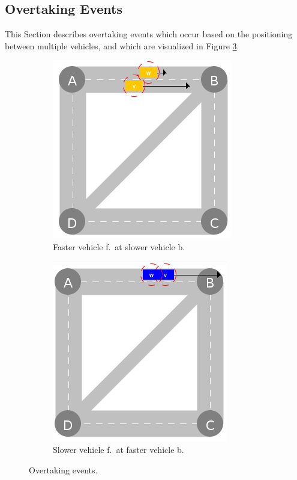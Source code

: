 \documentclass[graybox]{svmult}
\begin{document}
\vspace{4mm}

\subsection{Overtaking Events}
\label{sec:overtaking-events}

This Section describes overtaking events which occur based on the positioning between multiple vehicles, and which are visualized in Figure \ref{fig:overtaking-events}.

\begin{figure}
	\centering
	\begin{subfigure}{.45\textwidth}
	\centering
	\includegraphics[scale=0.35]{../../events/faster-vehicle-front-at-slower-vehicle-back.png}
	\caption{Faster vehicle f.\ at slower vehicle b.}
	\label{fig:faster-vehicle-front-at-slower-vehicle-back}
	\end{subfigure}
	\begin{subfigure}{.45\textwidth}
	\centering
	\includegraphics[scale=0.35]{../../events/slower-vehicle-front-at-faster-vehicle-back.png}
	\caption{Slower vehicle f.\ at faster vehicle b.}
	\label{fig:slower-vehicle-front-at-faster-vehicle-back}
	\end{subfigure}
	\caption{Overtaking events.}
	\label{fig:overtaking-events}
\end{figure}
\end{document}
